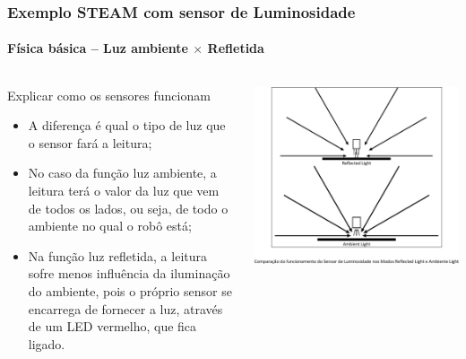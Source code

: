 \documentclass{beamer}
\begin{document}
\begin{frame}
\frametitle{Exemplo STEAM com sensor de Luminosidade}
\framesubtitle{Física básica -- Luz ambiente $\times$ Refletida}
	\begin{columns}
		\begin{block}{Explicar como os sensores funcionam}
			\begin{itemize}
				\item A diferença é qual o tipo de luz que o sensor fará a leitura;
				\item No caso da função luz ambiente, a leitura terá o valor da luz que vem de todos os lados, ou seja, de todo o ambiente no qual o robô está;
				\item Na função luz refletida, a leitura sofre menos influência da iluminação do ambiente, pois o próprio sensor se encarrega de fornecer a luz, através de um LED vermelho, que fica ligado.
			\end{itemize}
		\end{block}
	\begin{flushright}
	

    \includegraphics[width=1.1\textwidth]{imagens/sensor_cor}
	\end{flushright}
	\end{columns}
\end{frame}
\end{document}
